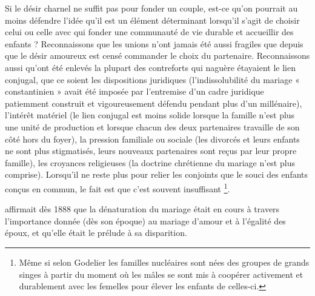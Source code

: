  Si le désir charnel ne suffit pas pour fonder un couple, est-ce qu'on pourrait au moins défendre l'idée qu'il est un élément déterminant lorsqu'il s'agit de choisir celui ou celle avec qui fonder une communauté de vie durable et accueillir des enfants ? Reconnaissons que les unions n'ont jamais été aussi fragiles que depuis que le désir amoureux est censé commander le choix du partenaire. Reconnaissons aussi qu'ont été enlevés la plupart des contreforts qui naguère étayaient le lien conjugal, que ce soient les dispositions juridiques (l'indissolubilité du mariage « constantinien » avait été imposée par l'entremise d'un cadre juridique patiemment construit et vigoureusement défendu pendant plus d'un millénaire), l'intérêt matériel (le lien conjugal est moins solide lorsque la famille n'est plus une unité de production et lorsque chacun des deux partenaires travaille de son côté hors du foyer), la pression familiale ou sociale (les divorcés et leurs enfants ne sont plus stigmatisés, leurs nouveaux partenaires sont reçus par leur propre famille), les croyances religieuses (la doctrine chrétienne du mariage n'est plus comprise). Lorsqu'il ne reste plus pour relier les conjoints que le souci des enfants conçus en commun, le fait est que c'est souvent insuffisant \footnote{Même si selon Godelier les familles nucléaires sont nées des groupes de grands singes à partir du moment où les mâles se sont mis à coopérer activement et durablement avec les femelles pour élever les enfants de celles-ci.}. 
 
   affirmait dès 1888 que la dénaturation du mariage était en cours à travers l'importance donnée (dès son époque) au mariage d'amour et à l'égalité des époux, et qu'elle était le prélude à sa disparition.

